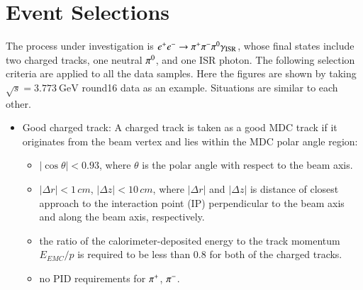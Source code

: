 \section{Event Selections}
\label{sec:selections}
The process under investigation is $e^{+} e^{-} \rightarrow \pi^+\pi^-\pi^{0} \gamma_{\mathrm{ISR}}$, whose final states include two charged tracks, one neutral $\pi^{0}$, and one ISR photon. The following selection criteria are applied to all the data samples. Here the figures are shown by taking $\sqrt{s}=3.773~\mathrm{GeV}$ round16 data as an example. Situations are similar to each other.


\begin{itemize}
    \item Good charged track:
          A charged track is taken as a good MDC track if it originates from the beam vertex and lies within the MDC polar angle region:
          \begin{itemize}
              \item $|\cos\theta|<0.93$, where $\theta$ is the polar angle with respect to the beam axis.
              \item $|\Delta r|<1\,\unit{cm}$, $|\Delta z|<10\,\unit{cm}$, where $|\Delta r|$ and $|\Delta z|$ is distance of closest approach to the interaction point (IP) perpendicular to the beam axis and along the beam axis, respectively.
              \item  the ratio of the calorimeter-deposited energy to the track momentum $E_{EMC}/p$ is required to be less than 0.8 for both of the charged tracks.
              \item no PID requirements for $\pi^+$, $\pi^-$.
          \end{itemize}



\end{itemize}
